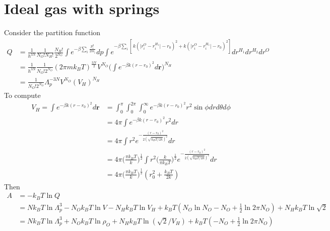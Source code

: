 \documentclass[aps,pre,a4paper,showkeys,fleqn]{revtex4}
\begin{document}
\section{Ideal gas with springs}
Consider the partition function
\begin{align*}
  Q
  &=
    \frac{1}{h^{3N}}\frac{1}{N_O! N_H!}
    \frac{N_H!}{2^{N_O}}
    \int e^{-\beta\sum_i\frac{p_i^2}{2m_i}} dp
    \int e^{-\beta \sum_i [\,k(\vert r^O_i-r^{H_1}_i\vert - r_0)^2 + k(\vert r^O_i-r^{H_1}_i\vert - r_0)^2]} dr^{H_1}dr^{H_2} dr^O\\
  &=
    \frac{1}{h^{3N}}\frac{1}{N_O! 2^{N_O}}
    (2\pi m k_BT)^{\frac{3N}{2}}
    V^{N_O}
    \Big(\int e^{-\beta k(r - r_0)^2 } d\bm r\Big)^{N_H} \\
  &=
    \frac{1}{N_O! 2^{N_O}}
    \Lambda_p^{-3N}
    V^{N_O}
    (V_H)^{N_H}
\end{align*}
To compute
\begin{align*}
  V_H = \int e^{-\beta k(r - r_0)^2 } d\bm r
  &=
    \int_0^\pi\int_0^{2\pi}\int_0^\infty e^{-\beta k(r - r_0)^2 } r^2\sin\phi dr d\theta d\phi\\
  &=
    4\pi\int e^{-\beta k(r - r_0)^2 } r^2 dr\\
  & =
    4\pi\int r^2 e^{-\frac{(r - r_0)^2}{2 (\sqrt{k_BT/2k})^2}}dr\\
  & =
    4\pi \Big(\frac{\pi k_B T}{k}\Big)^\frac12
    \int r^2
    \Big(\frac{k}{\pi k_B T}\Big)^\frac12
    e^{-\frac{(r - r_0)^2}{2 (\sqrt{k_BT/2k})^2}}dr\\
  &=
    4\pi \Big(\frac{\pi k_B T}{k}\Big)^\frac12 (r_0^2 + \frac{k_BT}{2k})
\end{align*}
Then
\begin{align*}
  A
  &=
    -k_BT\ln Q\\
  &=
    Nk_BT\ln \Lambda_p^3
    -N_Ok_BT\ln V
    -N_Hk_BT\ln V_H
    + k_BT(N_O\ln N_O - N_O + \frac12\ln 2\pi N_O)
    + N_H k_BT\ln \sqrt2 \\
  &=
    Nk_BT\ln \Lambda_p^3
    + N_Ok_BT\ln\rho_O
    + N_Hk_BT\ln(\sqrt2/V_H)
    + k_BT( - N_O + \frac12\ln 2\pi N_O)
\end{align*}
\end{document}

